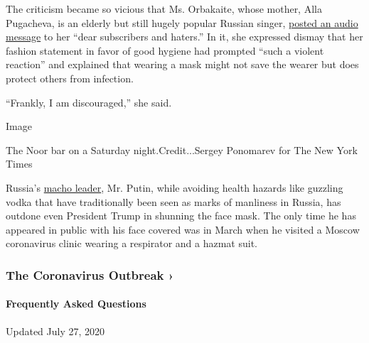 The criticism became so vicious that Ms. Orbakaite, whose mother, Alla
Pugacheva, is an elderly but still hugely popular Russian singer,
\href{https://www.instagram.com/tv/CCHJPXkpV72/?utm_source=ig_embed}{posted
an audio message} to her ``dear subscribers and haters.'' In it, she
expressed dismay that her fashion statement in favor of good hygiene had
prompted ``such a violent reaction'' and explained that wearing a mask
might not save the wearer but does protect others from infection.

``Frankly, I am discouraged,'' she said.

Image

The Noor bar on a Saturday night.Credit...Sergey Ponomarev for The New
York Times

Russia's
\href{https://www.nytimes.com/2017/08/05/world/europe/vladimir-putin-russia-summer-vacation.html}{macho
leader}, Mr. Putin, while avoiding health hazards like guzzling vodka
that have traditionally been seen as marks of manliness in Russia, has
outdone even President Trump in shunning the face mask. The only time he
has appeared in public with his face covered was in March when he
visited a Moscow coronavirus clinic wearing a respirator and a hazmat
suit.

\href{https://www.nytimes.com/news-event/coronavirus?action=click\&pgtype=Article\&state=default\&region=MAIN_CONTENT_3\&context=storylines_faq}{}

\hypertarget{the-coronavirus-outbreak-}{%
\subsubsection{The Coronavirus Outbreak
›}\label{the-coronavirus-outbreak-}}

\hypertarget{frequently-asked-questions}{%
\paragraph{Frequently Asked
Questions}\label{frequently-asked-questions}}

Updated July 27, 2020

